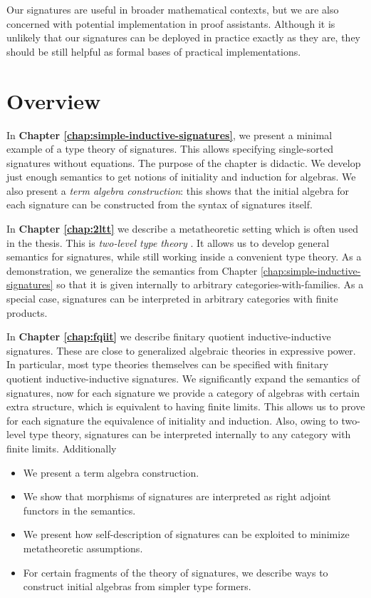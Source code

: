 \documentclass[12pt,a4paper,twoside,openany]{book}
\theoremstyle{remark}
\theoremstyle{definition}
\theoremstyle{theorem}
\begin{document}
Our signatures are useful in broader mathematical contexts, but we are also
concerned with potential implementation in proof assistants. Although it is
unlikely that our signatures can be deployed in practice exactly as they are, they
should be still helpful as formal bases of practical implementations.

\section{Overview}

In \textbf{Chapter \ref{chap:simple-inductive-signatures}}, we present a minimal
example of a type theory of signatures. This allows specifying single-sorted
signatures without equations. The purpose of the chapter is didactic. We develop
just enough semantics to get notions of initiality and induction for
algebras. We also present a \emph{term algebra construction}: this shows that
the initial algebra for each signature can be constructed from the syntax of
signatures itself.

In \textbf{Chapter \ref{chap:2ltt}} we describe a metatheoretic setting which is
often used in the thesis. This is \emph{two-level type theory}
\cite{twolevel}. It allows us to develop general semantics for signatures, while
still working inside a convenient type theory. As a demonstration, we generalize
the semantics from Chapter \ref{chap:simple-inductive-signatures} so that it is
given internally to arbitrary categories-with-families. As a special case,
signatures can be interpreted in arbitrary categories with finite products.

In \textbf{Chapter \ref{chap:fqiit}} we describe finitary quotient
inductive-inductive signatures. These are close to generalized algebraic
theories \cite{gat} in expressive power. In particular, most type theories
themselves can be specified with finitary quotient inductive-inductive
signatures. We significantly expand the semantics of signatures, now for each
signature we provide a category of algebras with certain extra structure, which
is equivalent to having finite limits. This allows us to prove for each
signature the equivalence of initiality and induction. Also, owing to two-level
type theory, signatures can be interpreted internally to any category with
finite limits. Additionally
\begin{itemize}
  \item We present a term algebra construction.
  \item We show that morphisms of signatures are interpreted as right adjoint functors
        in the semantics.
  \item We present how self-description of signatures can be exploited to minimize metatheoretic
        assumptions.
  \item For certain fragments of the theory of signatures, we describe ways to construct
        initial algebras from simpler type formers.
\end{itemize}
\end{document}
